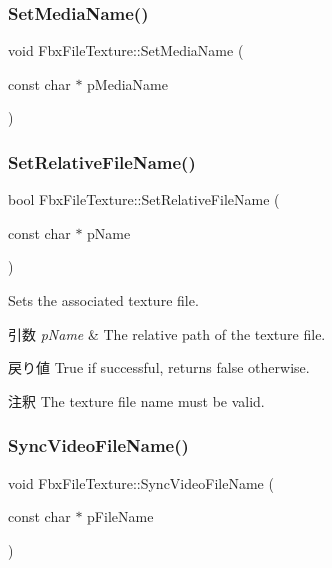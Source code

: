\subsubsection{\texorpdfstring{Set\+Media\+Name()}{SetMediaName()}}
{\footnotesize\ttfamily void Fbx\+File\+Texture\+::\+Set\+Media\+Name (\begin{DoxyParamCaption}\item[{const char $\ast$}]{p\+Media\+Name }\end{DoxyParamCaption})}

\mbox{\label{class_fbx_file_texture_a460992bc85c4087da594b60da1f2c6f5}} 
\subsubsection{\texorpdfstring{Set\+Relative\+File\+Name()}{SetRelativeFileName()}}
{\footnotesize\ttfamily bool Fbx\+File\+Texture\+::\+Set\+Relative\+File\+Name (\begin{DoxyParamCaption}\item[{const char $\ast$}]{p\+Name }\end{DoxyParamCaption})}

Sets the associated texture file. 
\begin{DoxyParams}{引数}
{\em p\+Name} & The relative path of the texture file. \\
\hline
\end{DoxyParams}
\begin{DoxyReturn}{戻り値}
{\ttfamily True} if successful, returns {\ttfamily false} otherwise. 
\end{DoxyReturn}
\begin{DoxyRemark}{注釈}
The texture file name must be valid. 
\end{DoxyRemark}
\mbox{\label{class_fbx_file_texture_a8d4cbc0baefe64cd40d88892dd6dda69}} 
\subsubsection{\texorpdfstring{Sync\+Video\+File\+Name()}{SyncVideoFileName()}}
{\footnotesize\ttfamily void Fbx\+File\+Texture\+::\+Sync\+Video\+File\+Name (\begin{DoxyParamCaption}\item[{const char $\ast$}]{p\+File\+Name }\end{DoxyParamCaption})\hspace{0.3cm}{\ttfamily [protected]}}

